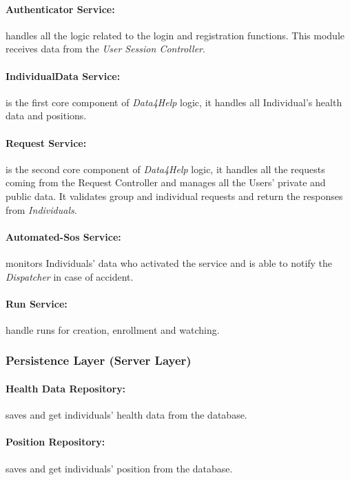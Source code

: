 \documentclass[a4paper]{article}
\begin{document}
    \paragraph{Authenticator Service:}
    handles all the logic related to the login and registration functions. This module receives data from the \textit{User Session Controller}.
    
    \paragraph{IndividualData Service:}
    is the first core component of \textit{Data4Help} logic, it handles all Individual's health data and positions.

    \paragraph{Request Service:}
    is the second core component of \textit{Data4Help} logic, it handles all the requests coming from the Request Controller and manages all the Users' private and public data. It validates group and individual requests and return the responses from \textit{Individuals}.
    
    \paragraph{Automated-Sos Service:}
    monitors Individuals' data who activated the service and is able to notify the \textit{Dispatcher} in case of accident.
    
    \paragraph{Run Service:}
    handle runs for creation, enrollment and watching.
    
    \subsubsection{Persistence Layer (Server Layer)}
        
    \paragraph{Health Data Repository:}
    saves and get individuals' health data from the database.
    
    \paragraph{Position Repository:}
    saves and get individuals' position from the database.
    
\end{document}
